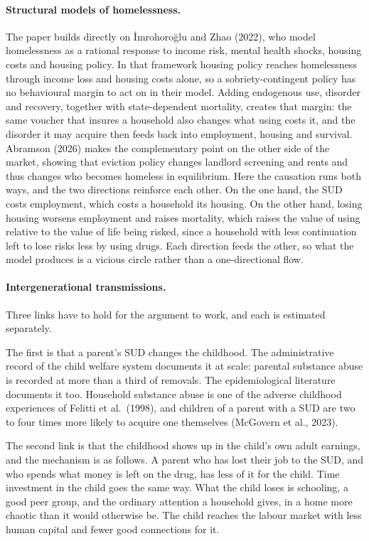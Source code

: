 \documentclass[10pt]{article}
\begin{document}
\paragraph{Structural models of homelessness.} The paper builds directly on
\.{I}mrohoro\u{g}lu and Zhao (2022), who model homelessness as a rational
response to income risk, mental health shocks, housing costs and housing policy.
In that framework housing policy reaches homelessness through income loss and housing
costs alone, so a sobriety-contingent policy has no behavioural margin to act on
in their model.
Adding endogenous use, disorder and recovery, together with state-dependent mortality, creates that margin: the same voucher that insures a household also
changes what using costs it, and the disorder it may acquire then feeds back into
employment, housing and survival. Abramson (2026) makes the complementary
point on the other side of the market, showing that eviction policy changes landlord
screening and rents and thus changes who becomes homeless in equilibrium. Here the
causation runs both ways, and the two directions reinforce each other. On the one
hand, the SUD costs employment, which costs a household its housing. On the other
hand, losing housing worsens employment and raises mortality, which raises the value
of using relative to the value of life being risked, since a household with less
continuation left to lose risks less by using drugs. Each direction
feeds the other, so what the model produces is a vicious circle rather than a one-directional flow.



\paragraph{Intergenerational transmissions.} Three links have to
hold for the argument to work, and each is estimated separately.

The first is that a parent's SUD changes the childhood. The administrative
record of the child welfare system documents it at scale: parental substance abuse is
recorded at more than a third of removals. The epidemiological literature
documents it too. Household substance abuse is one of the adverse childhood
experiences of Felitti et al.\ (1998), and children of a parent with a SUD are two to
four times more likely to acquire one themselves (McGovern et al., 2023).

The second link is that the childhood shows up in the child's own adult
earnings, and the mechanism is as follows. A parent who has lost their job
to the SUD, and who spends what money is left on the drug, has less of it for the
child. Time investment in the child goes the same way. What the child loses is schooling, a good peer group, and the ordinary
attention a household gives, in a home more chaotic than it would otherwise be. The
child reaches the labour market with less human capital and fewer good connections for it.
\end{document}
